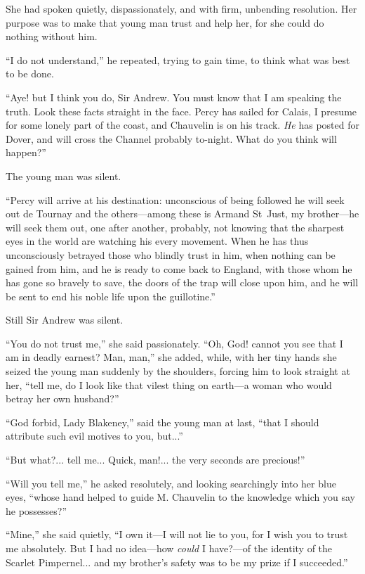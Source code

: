 She had spoken quietly, dispassionately, and with firm, unbending resolution. Her purpose was to make that young man trust and help her, for she could do nothing without him.

\enquote{I do not understand,} he repeated, trying to gain time, to think what was best to be done.

\enquote{Aye! but I think you do, Sir Andrew. You must know that I am speaking the truth. Look these facts straight in the face. Percy has sailed for Calais, I presume for some lonely part of the coast, and Chauvelin is on his track. \textit{He} has posted for Dover, and will cross the Channel probably to-night. What do you think will happen?}

The young man was silent.

\enquote{Percy will arrive at his destination: unconscious of being followed he will seek out de Tournay and the others---among these is Armand St~Just, my brother---he will seek them out, one after another, probably, not knowing that the sharpest eyes in the world are watching his every movement. When he has thus unconsciously betrayed those who blindly trust in him, when nothing can be gained from him, and he is ready to come back to England, with those whom he has gone so bravely to save, the doors of the trap will close upon him, and he will be sent to end his noble life upon the guillotine.}

Still Sir Andrew was silent.

\enquote{You do not trust me,} she said passionately. \enquote{Oh, God! cannot you see that I am in deadly earnest? Man, man,} she added, while, with her tiny hands she seized the young man suddenly by the shoulders, forcing him to look straight at her, \enquote{tell me, do I look like that vilest thing on earth---a woman who would betray her own husband?}

\enquote{God forbid, Lady Blakeney,} said the young man at last, \enquote{that I should attribute such evil motives to you, but...}

\enquote{But what?... tell me... Quick, man!... the very seconds are precious!}

\enquote{Will you tell me,} he asked resolutely, and looking searchingly into her blue eyes, \enquote{whose hand helped to guide M. Chauvelin to the knowledge which you say he possesses?}

\enquote{Mine,} she said quietly, \enquote{I own it---I will not lie to you, for I wish you to trust me absolutely. But I had no idea---how \textit{could} I have?---of the identity of the Scarlet Pimpernel... and my brother's safety was to be my prize if I succeeded.}


